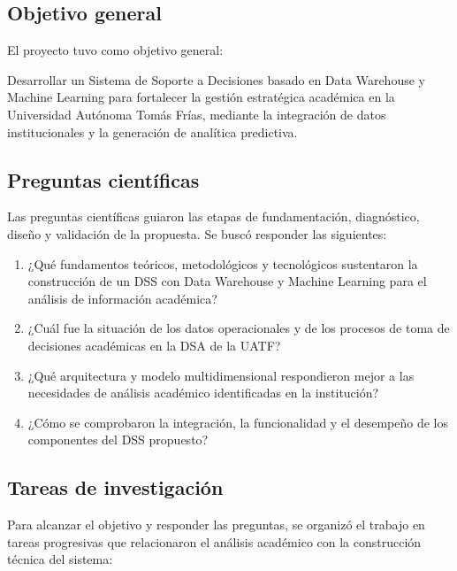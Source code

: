 \documentclass[11pt,oneside,openany]{book}
\begin{document}
\subsection*{Objetivo general}

El proyecto tuvo como objetivo general:

Desarrollar un Sistema de Soporte a Decisiones basado en Data Warehouse y Machine Learning para fortalecer la gestión estratégica académica en la Universidad Autónoma Tomás Frías, mediante la integración de datos institucionales y la generación de analítica predictiva.

\subsection*{Preguntas científicas}

Las preguntas científicas guiaron las etapas de fundamentación, diagnóstico, diseño y validación de la propuesta. Se buscó responder las siguientes:

\begin{enumerate}[leftmargin=*]
\item ¿Qué fundamentos teóricos, metodológicos y tecnológicos sustentaron la construcción de un DSS con Data Warehouse y Machine Learning para el análisis de información académica?
\item ¿Cuál fue la situación de los datos operacionales y de los procesos de toma de decisiones académicas en la DSA de la UATF?
\item ¿Qué arquitectura y modelo multidimensional respondieron mejor a las necesidades de análisis académico identificadas en la institución?
\item ¿Cómo se comprobaron la integración, la funcionalidad y el desempeño de los componentes del DSS propuesto?
\end{enumerate}
\subsection*{Tareas de investigación}

Para alcanzar el objetivo y responder las preguntas, se organizó el trabajo en tareas progresivas que relacionaron el análisis académico con la construcción técnica del sistema:
\end{document}
